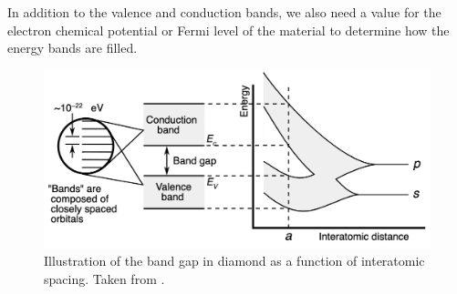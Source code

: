 In addition to the valence and conduction bands, we also need a value for the electron chemical potential or Fermi level of the material to determine how the energy bands are filled. 

\begin{figure}[htp]
\centering
\includegraphics[width=\linewidth]{images/band_gap.png}
\caption[Illustration of the band gap in diamond as a function of interatomic spacing.]{Illustration of the band gap in diamond as a function of interatomic spacing. Taken from \cite{Chetvorno2017}.}
\label{figure:band_gap}
\end{figure}


